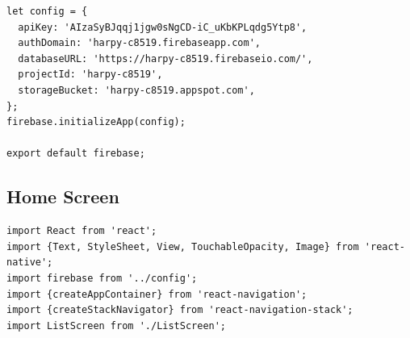 \documentclass{article}
\begin{document}
\begin{appendices}
\begin{verbatim}
let config = {
  apiKey: 'AIzaSyBJqqj1jgw0sNgCD-iC_uKbKPLqdg5Ytp8',
  authDomain: 'harpy-c8519.firebaseapp.com',
  databaseURL: 'https://harpy-c8519.firebaseio.com/',
  projectId: 'harpy-c8519',
  storageBucket: 'harpy-c8519.appspot.com',
};
firebase.initializeApp(config);

export default firebase;
\end{verbatim}

\subsection{Home Screen}
\begin{verbatim}
import React from 'react';
import {Text, StyleSheet, View, TouchableOpacity, Image} from 'react-native';
import firebase from '../config';
import {createAppContainer} from 'react-navigation';
import {createStackNavigator} from 'react-navigation-stack';
import ListScreen from './ListScreen';


\end{verbatim}
\end{appendices}
\end{document}
